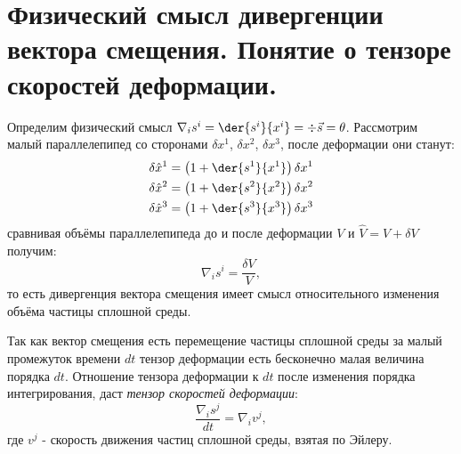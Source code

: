 \chapter{Физический смысл дивергенции вектора смещения. Понятие о тензоре
скоростей деформации.}
Определим физический смысл \( \nabla_is^i = \der{s^i}{x^i} = \div\vec{s} =
\theta \). Рассмотрим малый параллелепипед со сторонами \( \delta x^1 \),
\( \delta x^2 \), \( \delta x^3 \), после деформации они станут:
\begin{gather*}
	\delta\hat{x}^1 = \left(1 + \der{s^1}{x^1}\right)\delta x^1\\
	\delta\hat{x}^2 = \left(1 + \der{s^2}{x^2}\right)\delta x^2\\
	\delta\hat{x}^3 = \left(1 + \der{s^3}{x^3}\right)\delta x^3
\end{gather*}
сравнивая объёмы параллелепипеда до и после деформации \( V \) и
\( \hat{V} = V + \delta V \) получим:
\[
	\nabla_is^i = \frac{\delta V}{V},
\]
то есть дивергенция вектора смещения имеет смысл относительного изменения
объёма частицы сплошной среды.

Так как вектор смещения есть перемещение частицы сплошной среды за малый
промежуток времени \( dt \) тензор деформации есть бесконечно малая величина
порядка \( dt \). Отношение тензора деформации к \( dt \) после изменения
порядка интегрирования, даст \emph{тензор скоростей деформации}:
\[
	\frac{\nabla_is^j}{dt} = \nabla_iv^j,
\]
где \( v^j \) - скорость движения частиц сплошной среды, взятая по Эйлеру.
\newpage
